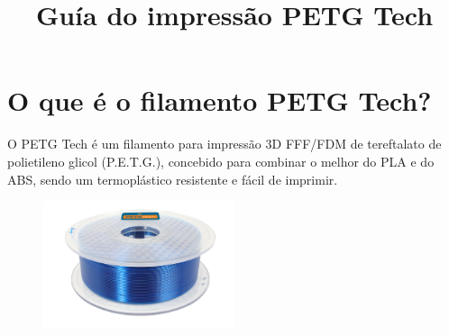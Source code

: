 \documentclass[11pt,a4paper]{article}
\title{Guía do impressão PETG Tech}
\date{}
\begin{document}

\section{﻿O que é o filamento PETG Tech?}O PETG Tech é um filamento para impressão 3D FFF/FDM de tereftalato de polietileno glicol (P.E.T.G.), concebido para combinar o melhor do PLA e do ABS, sendo um termoplástico resistente e fácil de imprimir.
\begin{figure}[H]
\centering
\includegraphics[width=0.5\textwidth,cfbox=azul_marcos 1pt 0pt]{FOTOS/PETGKILOAZUL}
\end{figure}
\end{document}
